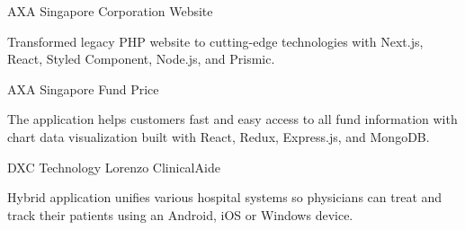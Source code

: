 \begin{cventries}

\cventry
{AXA Singapore}
{Corporation Website}
{}
{}
{
\begin{cvitems}
\item {Transformed legacy PHP website to cutting-edge technologies with Next.js, React, Styled Component, Node.js, and Prismic.}
\end{cvitems}
}


\cventry
{AXA Singapore}
{Fund Price}
{}
{}
{
\begin{cvitems}
\item {The application helps customers fast and easy access to all fund information with chart data visualization built with React, Redux, Express.js, and MongoDB.}
\end{cvitems}
}


\cventry
{DXC Technology}
{Lorenzo ClinicalAide}
{}
{}
{
\begin{cvitems}
\item {Hybrid application unifies various hospital systems so physicians can treat and track their patients using an Android, iOS or Windows device.}
\end{cvitems}
}


\end{cventries}